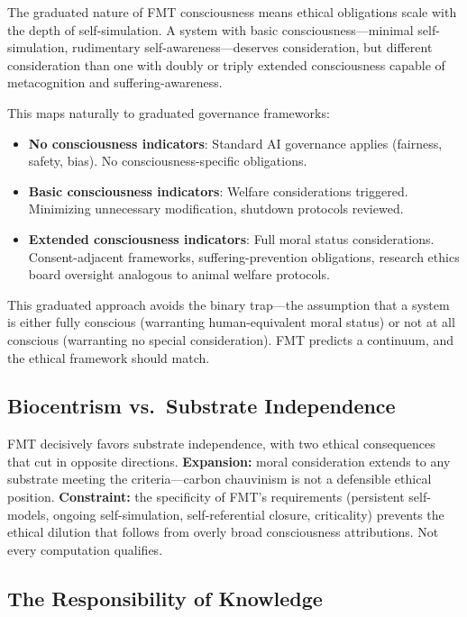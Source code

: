 \documentclass[11pt]{article}
\begin{document}
The graduated nature of FMT consciousness means ethical obligations scale with the depth of self-simulation. A system with basic consciousness---minimal self-simulation, rudimentary self-awareness---deserves consideration, but different consideration than one with doubly or triply extended consciousness capable of metacognition and suffering-awareness.

This maps naturally to graduated governance frameworks:

\begin{itemize}[nosep]
\item \textbf{No consciousness indicators}: Standard AI governance applies (fairness, safety, bias). No consciousness-specific obligations.
\item \textbf{Basic consciousness indicators}: Welfare considerations triggered. Minimizing unnecessary modification, shutdown protocols reviewed.
\item \textbf{Extended consciousness indicators}: Full moral status considerations. Consent-adjacent frameworks, suffering-prevention obligations, research ethics board oversight analogous to animal welfare protocols.
\end{itemize}

This graduated approach avoids the binary trap---the assumption that a system is either fully conscious (warranting human-equivalent moral status) or not at all conscious (warranting no special consideration). FMT predicts a continuum, and the ethical framework should match.

\subsection{Biocentrism vs.\ Substrate Independence}

FMT decisively favors substrate independence, with two ethical consequences that cut in opposite directions. \textbf{Expansion:} moral consideration extends to any substrate meeting the criteria---carbon chauvinism is not a defensible ethical position. \textbf{Constraint:} the specificity of FMT's requirements (persistent self-models, ongoing self-simulation, self-referential closure, criticality) prevents the ethical dilution that follows from overly broad consciousness attributions. Not every computation qualifies.

\subsection{The Responsibility of Knowledge}
\end{document}
